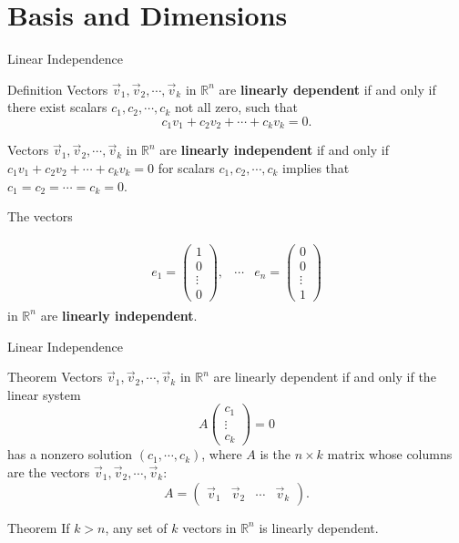\documentclass{beamer}
\begin{document}
\section{Basis and Dimensions}
\begin{frame}{Linear Independence}
    \begin{block}{Definition}
    Vectors $\vec{v}_1,\vec{v}_2,\cdots, \vec{v}_k$ in $\mathbb{R}^n$ are \textbf{linearly dependent} if and only if there exist scalars $c_1,c_2, \cdots , c_k$ not all zero, such that 
    \[c_1v_1+c_2v_2+\cdots+c_kv_k=0.
    \]
    
    Vectors $\vec{v}_1,\vec{v}_2,\cdots, \vec{v}_k$ in $\mathbb{R}^n$ are \textbf{linearly independent} if and only if $c_1v_1+c_2v_2+\cdots+c_kv_k=0$ for scalars $c_1,c_2, \cdots , c_k$ implies that  $c_1=c_2=\cdots =c_k=0$.
    \end{block}
    The vectors 
    
    \begin{align*}
        \begin{array}{ccc}
           e_1 =\begin{pmatrix}
           1\\ 0\\ \vdots \\0
           \end{pmatrix},& \cdots   
             & e_n =\begin{pmatrix}
           0\\ 0\\ \vdots \\1
           \end{pmatrix}
        \end{array}
    \end{align*}
    in $\mathbb{R}^n$ are \textbf{linearly independent}.
\end{frame}

\begin{frame}{Linear Independence}
\begin{block}{Theorem}
Vectors $\vec{v}_1,\vec{v}_2,\cdots, \vec{v}_k$ in $\mathbb{R}^n$ are linearly dependent if and only if the linear system 
\[A\begin{pmatrix}
c_1\\ \vdots \\ c_k \end{pmatrix}=0
\]
has a nonzero solution $(c_1,\cdots, c_k)$, where $A$ is the $n\times k$ matrix whose columns are the vectors $\vec{v}_1,\vec{v}_2,\cdots, \vec{v}_k$:
\[A=\begin{pmatrix}
\vec{v}_1 &\vec{v}_2 & \cdots & \vec{v}_k \end{pmatrix}.
\]
\end{block}
\begin{block}{Theorem}
If $k>n$, any set of $k$ vectors in $\mathbb{R}^n$ is linearly dependent.
\end{block}
\end{frame}
\end{document}
